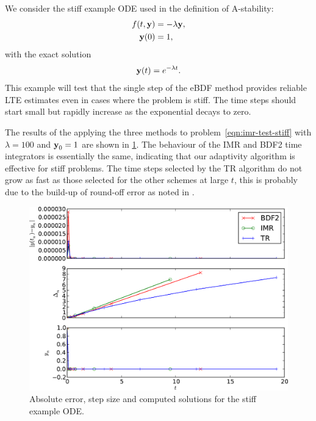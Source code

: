 We consider the stiff example ODE used in the definition of A-stability:
\begin{equation}
  \label{eqn:imr-test-stiff}
  \begin{aligned}
    f(t, \boldsymbol{\mathrm{y}}) &= -\lambda \boldsymbol{\mathrm{y}}, \\
    \boldsymbol{\mathrm{y}}(0) &= 1,
  \end{aligned}
\end{equation}
with the exact solution
\begin{equation}
  \label{eqn:imr-test-stiff-exact}
  \boldsymbol{\mathrm{y}}(t) = e^{-\lambda t}.
\end{equation}
This example will test that the single step of the eBDF method provides reliable LTE estimates even in cases where the problem is stiff.
The time steps should start small but rapidly increase as the exponential decays to zero.

The results of the applying the three methods to problem~\cref{eqn:imr-test-stiff} with $\lambda = 100$ and $\boldsymbol{\mathrm{y}}_0 = 1$ are shown in \cref{fig:imr-stiff-example}.
The behaviour of the IMR and BDF2 time integrators is essentially the same, indicating that our adaptivity algorithm is effective for stiff problems.
The time steps selected by the TR algorithm do not grow as fast as those selected for the other schemes at large $t$, this is probably due to the build-up of round-off error as noted in \eg \cite{Gresho2008}.

\begin{figure}
  \centering
  \includegraphics[width=1\textwidth]{plots/aimr_odes_traces/simple_stiff-errornormsvs-dtsvs-tracevaluesvstimes}
  \caption{Absolute error, step size and computed solutions for the stiff example ODE.}
  \label{fig:imr-stiff-example}
\end{figure}


